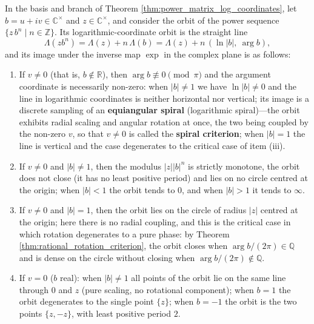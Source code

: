 \begin{corollary}\label{cor:spiral_criterion}
In the basis and branch of Theorem \ref{thm:power_matrix_log_coordinates}, let $b=u+iv\in\mathbb{C}^{\times}$ and $z\in\mathbb{C}^{\times}$, and consider the orbit of the power sequence $\{z\,b^n\mid n\in\mathbb{Z}\}$. Its logarithmic-coordinate orbit is the straight line
\[
\Lambda(zb^n)=\Lambda(z)+n\,\Lambda(b)=\Lambda(z)+n\,(\ln|b|,\ \arg b),
\]
and its image under the inverse map $\exp$ in the complex plane is as follows:
\begin{enumerate}[label=(\roman*)]
    \item If $v\neq0$ (that is, $b\notin\mathbb{R}$), then $\arg b\not\equiv0\pmod{\pi}$ and the argument coordinate is necessarily non-zero: when $|b|\neq1$ we have $\ln|b|\neq0$ and the line in logarithmic coordinates is neither horizontal nor vertical; its image is a discrete sampling of an \textbf{equiangular spiral} (logarithmic spiral)---the orbit exhibits radial scaling and angular rotation at once, the two being coupled by the non-zero $v$, so that $v\neq0$ is called the \textbf{spiral criterion}; when $|b|=1$ the line is vertical and the case degenerates to the critical case of item (iii).
    \item If $v\neq0$ and $|b|\neq1$, then the modulus $|z||b|^n$ is strictly monotone, the orbit does not close (it has no least positive period) and lies on no circle centred at the origin; when $|b|<1$ the orbit tends to $0$, and when $|b|>1$ it tends to $\infty$.
    \item If $v\neq0$ and $|b|=1$, then the orbit lies on the circle of radius $|z|$ centred at the origin; here there is no radial coupling, and this is the critical case in which rotation degenerates to a pure phase: by Theorem \ref{thm:rational_rotation_criterion}, the orbit closes when $\arg b/(2\pi)\in\mathbb{Q}$ and is dense on the circle without closing when $\arg b/(2\pi)\notin\mathbb{Q}$.
    \item If $v=0$ ($b$ real): when $|b|\neq1$ all points of the orbit lie on the same line through $0$ and $z$ (pure scaling, no rotational component); when $b=1$ the orbit degenerates to the single point $\{z\}$; when $b=-1$ the orbit is the two points $\{z,-z\}$, with least positive period $2$.
\end{enumerate}
\end{corollary}

